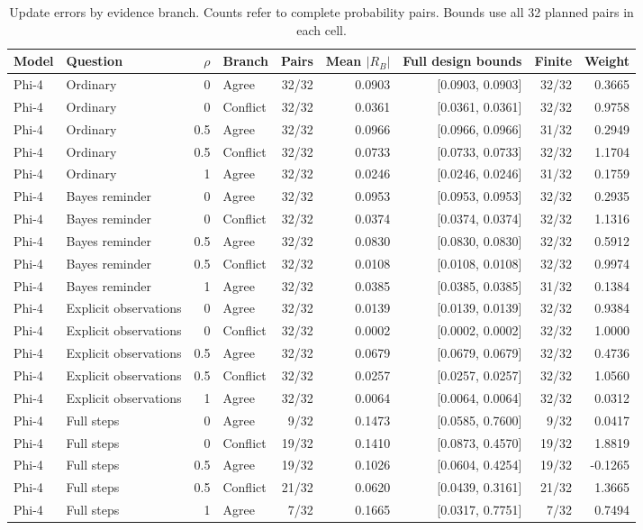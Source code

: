 \begin{table}[t]
\centering
{\small\setlength{\tabcolsep}{4pt}
\begin{tabular*}{\textwidth}{@{\extracolsep{\fill}}llrlrrrrr@{}}
\toprule
Model & Question & $\rho$ & Branch & Pairs & Mean $|R_B|$ & Full design bounds & Finite & Weight \\
\midrule
Phi-4 & Ordinary & 0 & Agree & 32/32 & 0.0903 & [0.0903, 0.0903] & 32/32 & 0.3665 \\
Phi-4 & Ordinary & 0 & Conflict & 32/32 & 0.0361 & [0.0361, 0.0361] & 32/32 & 0.9758 \\
Phi-4 & Ordinary & 0.5 & Agree & 32/32 & 0.0966 & [0.0966, 0.0966] & 31/32 & 0.2949 \\
Phi-4 & Ordinary & 0.5 & Conflict & 32/32 & 0.0733 & [0.0733, 0.0733] & 32/32 & 1.1704 \\
Phi-4 & Ordinary & 1 & Agree & 32/32 & 0.0246 & [0.0246, 0.0246] & 31/32 & 0.1759 \\
Phi-4 & Bayes reminder & 0 & Agree & 32/32 & 0.0953 & [0.0953, 0.0953] & 32/32 & 0.2935 \\
Phi-4 & Bayes reminder & 0 & Conflict & 32/32 & 0.0374 & [0.0374, 0.0374] & 32/32 & 1.1316 \\
Phi-4 & Bayes reminder & 0.5 & Agree & 32/32 & 0.0830 & [0.0830, 0.0830] & 32/32 & 0.5912 \\
Phi-4 & Bayes reminder & 0.5 & Conflict & 32/32 & 0.0108 & [0.0108, 0.0108] & 32/32 & 0.9974 \\
Phi-4 & Bayes reminder & 1 & Agree & 32/32 & 0.0385 & [0.0385, 0.0385] & 31/32 & 0.1384 \\
Phi-4 & Explicit observations & 0 & Agree & 32/32 & 0.0139 & [0.0139, 0.0139] & 32/32 & 0.9384 \\
Phi-4 & Explicit observations & 0 & Conflict & 32/32 & 0.0002 & [0.0002, 0.0002] & 32/32 & 1.0000 \\
Phi-4 & Explicit observations & 0.5 & Agree & 32/32 & 0.0679 & [0.0679, 0.0679] & 32/32 & 0.4736 \\
Phi-4 & Explicit observations & 0.5 & Conflict & 32/32 & 0.0257 & [0.0257, 0.0257] & 32/32 & 1.0560 \\
Phi-4 & Explicit observations & 1 & Agree & 32/32 & 0.0064 & [0.0064, 0.0064] & 32/32 & 0.0312 \\
Phi-4 & Full steps & 0 & Agree & 9/32 & 0.1473 & [0.0585, 0.7600] & 9/32 & 0.0417 \\
Phi-4 & Full steps & 0 & Conflict & 19/32 & 0.1410 & [0.0873, 0.4570] & 19/32 & 1.8819 \\
Phi-4 & Full steps & 0.5 & Agree & 19/32 & 0.1026 & [0.0604, 0.4254] & 19/32 & -0.1265 \\
Phi-4 & Full steps & 0.5 & Conflict & 21/32 & 0.0620 & [0.0439, 0.3161] & 21/32 & 1.3665 \\
Phi-4 & Full steps & 1 & Agree & 7/32 & 0.1665 & [0.0317, 0.7751] & 7/32 & 0.7494 \\
\bottomrule
\end{tabular*}
}
\caption{Update errors by evidence branch. Counts refer to complete probability pairs. Bounds use all 32 planned pairs in each cell.}
\label{tab:followup-updates-phi}
\end{table}
